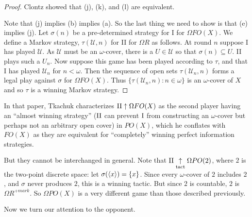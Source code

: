 \documentclass[11pt]{article}
\theoremstyle{plain}
\theoremstyle{definition}
\theoremstyle{remark}
\theoremstyle{plain}
\theoremstyle{definition}
\theoremstyle{remark}
\begin{document}
\begin{proof}
Clontz showed that (j), (k), and (l) are equivalent.

Note that (j) implies (b) implies (a).
So the last thing we need to show is that (e) implies (j).
Let \(\sigma(n)\) be a pre-determined strategy for I for \(\Omega FO(X)\).
We define a Markov strategy, \(\tau(\mathcal{U},n)\) for II for \(\Omega R\) as follows.
At round \(n\) suppose I has played \(\mathcal{U}\).
As \(\mathcal{U}\) must be an \(\omega\)-cover, there is a \(U \in \mathcal{U}\) so that \(\sigma(n) \subseteq U\).
II plays such a \(U_n\).
Now suppose this game has been played according to \(\tau\), and that I has played \(\mathcal{U}_n\) for \(n < \omega\).
Then the sequence of open sets \(\tau(\mathcal{U}_n,n)\) forms a legal play against \(\sigma\) for \(\Omega FO(X)\).
Thus \(\{\tau(\mathcal{U}_n,n) : n \in \omega\}\) is an \(\omega\)-cover of \(X\) and so \(\tau\) is a winning Markov strategy.
\end{proof}

In that paper, Tkachuk characterizes \(\mathrm{II}\uparrow\Omega FO(X)\)
as the second player having an ``almost winning strategy''
(\(\mathrm{II}\) can prevent \(\mathrm{I}\) from constructing an \(\omega\)-cover
but perhaps not an arbitrary open cover)
in \(PO(X)\), which he conflates with \(FO(X)\) as they are
equivalent for ``completely'' winning perfect information strategies. 

But they cannot be interchanged in general.
Note that \(\mathrm{II}\underset{\text{tact}}{\uparrow}\Omega PO(2)\), where \(2\) is the two-point discrete space:
let \(\sigma(\langle x\rangle)=\{x\}\). Since every \(\omega\)-cover of \(2\) includes \(2\),
and \(\sigma\) never produces \(2\), this is a winning tactic. But since \(2\)
is countable, \(2\) is \(\Omega R^{+mark}\).
So \(\Omega PO(X)\) is a very different game than those described previously.


Now we turn our attention to the opponent.
\end{document}
